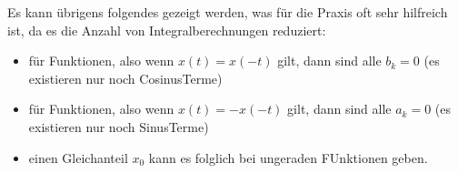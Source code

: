 \documentclass[letterpaper,10pt,english]{jupyterBook}
\begin{document}
\sphinxAtStartPar
Es kann übrigens folgendes gezeigt werden, was für die Praxis oft sehr hilfreich ist, da es die Anzahl von Integralberechnungen reduziert:
\begin{itemize}
\item {} 
\sphinxAtStartPar
für  Funktionen, also wenn \(x(t) = x(-t)\) gilt, dann sind alle \(b_k = 0\) (es existieren nur noch Cosinus\sphinxhyphen{}Terme)

\item {} 
\sphinxAtStartPar
für  Funktionen, also wenn \(x(t) = -x(-t)\) gilt, dann sind alle \(a_k = 0\) (es existieren nur noch Sinus\sphinxhyphen{}Terme)

\item {} 
\sphinxAtStartPar
einen Gleichanteil \(x_0\) kann es folglich bei ungeraden FUnktionen  geben.

\end{itemize}
\end{document}
